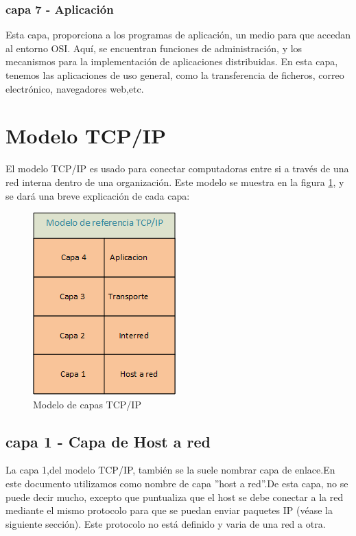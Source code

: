 \subsubsection{capa 7 - Aplicación} 
Esta capa, proporciona a los programas de aplicación, un medio para que accedan al entorno OSI. Aquí, se encuentran funciones de administración, y los mecanismos para la implementación de aplicaciones distribuidas. En esta capa, tenemos las aplicaciones de uso general, como la transferencia de ficheros, correo electrónico, navegadores web,etc. 


\section{Modelo TCP/IP} 
  El modelo TCP/IP es usado para conectar computadoras entre si a través de una red interna dentro de una organización. Este modelo se muestra en la figura \ref{fig:model_tcpip}, y se dará una breve explicación de cada capa: 
  \begin{figure}[ht]
  	\centering
  	\includegraphics{model_tcpip}
  	\caption{Modelo de capas TCP/IP}
  	\label{fig:model_tcpip}
  \end{figure} 

\subsection{capa 1 - Capa de Host a red}
La capa 1,del modelo TCP/IP, también se la suele nombrar capa de enlace.En este documento utilizamos como nombre de capa ''host a red''.De esta capa, no se puede decir mucho, excepto que puntualiza que el host se debe conectar a la red mediante el mismo protocolo para que se puedan enviar paquetes IP (véase la siguiente sección). Este protocolo no está definido y varia de una red a otra.
